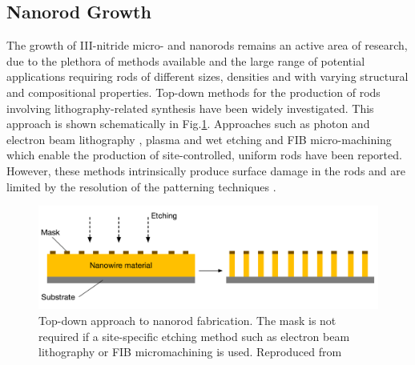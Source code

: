\subsection{Nanorod Growth}
\label{nanorod growth}
The growth of III-nitride micro- and nanorods remains an active area of research, due to the plethora of methods available and the large range of potential applications requiring rods of different sizes, densities and with varying structural and compositional properties. 
Top-down methods for the production of rods involving lithography-related synthesis have been widely investigated. This approach is shown schematically in Fig.\ref{topdown}. Approaches such as photon \cite{Liu201558} and electron beam lithography \cite{Maliakkal2015}, plasma and wet etching \cite{Debnath2014}  and FIB micro-machining \cite{Dhara2010} which enable the production of site-controlled, uniform rods have been reported. However, these methods intrinsically produce surface damage in the rods and are limited by the resolution of the patterning techniques \cite{Bao2016}.
\begin{figure}[h]
	\centering
	\includegraphics[width=1\textwidth]{Figs/Ch6/topdown.png}
	\caption {Top-down approach to nanorod fabrication. The mask is not required if a site-specific etching method such as electron beam lithography or FIB micromachining is used. Reproduced from \cite{Bao2016}}
	\label{topdown}
\end{figure}
\FloatBarrier 
